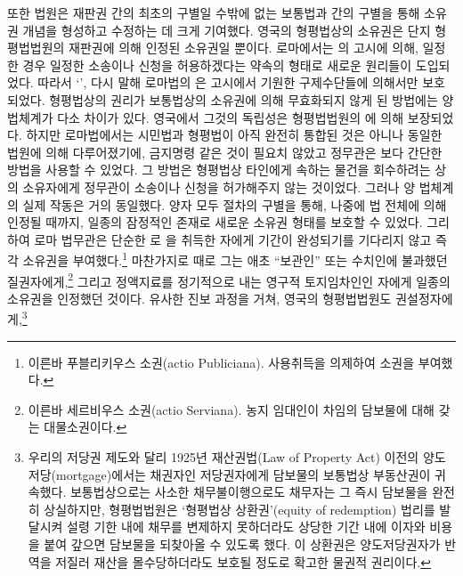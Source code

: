 또한 법원은
재판권 간의 최초의 구별일 수밖에 없는
보통법과  간의 구별을 통해
소유권 개념을 형성하고 수정하는 데
크게 기여했다.
영국의 형평법상의 소유권은 단지
형평법법원의 재판권에 의해 인정된 소유권일 뿐이다.
로마에서는
의 고시에 의해,
일정한 경우 일정한 소송이나 신청을 허용하겠다는 약속의 형태로
새로운 원리들이 도입되었다.
따라서 `',
다시 말해 로마법의 은
고시에서 기원한 구제수단들에 의해서만 보호되었다.
형평법상의 권리가 보통법상의 소유권에 의해
무효화되지 않게 된 방법에는 양 법체계가 다소 차이가 있다.
영국에서 그것의 독립성은 형평법법원의
에 의해 보장되었다.
하지만 로마법에서는
시민법과 형평법이
아직 완전히 통합된 것은 아니나
동일한 법원에 의해 다루어졌기에,
금지명령 같은 것이 필요치 않았고
정무관은 보다 간단한 방법을 사용할 수 있었다.
그 방법은 형평법상 타인에게 속하는 물건을 회수하려는
상의 소유자에게 정무관이 소송이나 신청을 허가해주지 않는 것이었다.
그러나 양 법체계의 실제 작동은 거의 동일했다.
양자 모두 절차의 구별을 통해,
나중에 법 전체에 의해 인정될 때까지,
일종의 잠정적인 존재로 새로운 소유권 형태를
보호할 수 있었다.
그리하여
로마 법무관은
단순한 로 을 취득한 자에게
 기간이 완성되기를 기다리지 않고
즉각 소유권을 부여했다.\footnote{%
  이른바 푸블리키우스 소권(actio Publiciana).
  사용취득을 의제하여 소권을 부여했다. }
마찬가지로 때로 그는
애초 ``보관인'' 또는
수치인에 불과했던
질권자에게,\footnote{%
  이른바 세르비우스 소권(actio Serviana).
  농지 임대인이 차임의 담보물에 대해 갖는 대물소권이다.
  }
그리고 정액지료를 정기적으로 내는 영구적 토지임차인인
자에게
일종의 소유권을 인정했던 것이다.
유사한 진보 과정을 거쳐,
영국의 형평법법원도
권설정자에게,\footnote{%
  우리의 저당권 제도와 달리
  1925년 재산권법(Law of Property Act) 이전의 양도저당(mortgage)에서는
  채권자인 저당권자에게 담보물의 보통법상 부동산권이 귀속했다.
  보통법상으로는 사소한 채무불이행으로도
  채무자는 그 즉시 담보물을 완전히 상실하지만,
  형평법법원은
  `형평법상 상환권'(equity of redemption) 법리를 발달시켜
  설령 기한 내에 채무를 변제하지 못하더라도
  상당한 기간 내에 이자와 비용을 붙여 갚으면
  담보물을 되찾아올 수 있도록 했다.
  이 상환권은 양도저당권자가 반역을 저질러 재산을 몰수당하더라도
  보호될 정도로 확고한 물권적 권리이다.
  }
